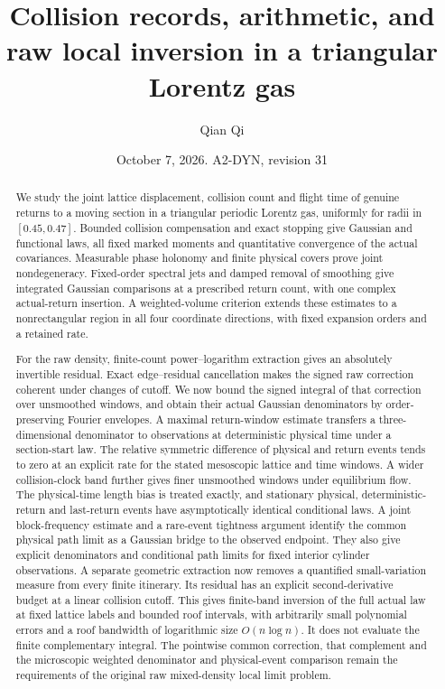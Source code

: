 \documentclass[11pt,reqno]{amsart}
\title[Collision records and raw local inversion]{Collision records, arithmetic, and raw local inversion in a triangular Lorentz gas}
\author{Qian Qi}
\date{October 7, 2026. A2-DYN, revision 31}
\numberwithin{equation}{section}
\theoremstyle{definition}\newtheorem{definition}[theorem]{Definition}
\theoremstyle{remark}\newtheorem{remark}[theorem]{Remark}
\begin{document}
\raggedbottom
\begin{abstract}
We study the joint lattice displacement, collision count and flight time
of genuine returns to a moving section in a triangular periodic Lorentz
gas, uniformly for radii in $[0.45,0.47]$. Bounded collision compensation
and exact stopping give Gaussian and functional laws, all fixed marked
moments and quantitative convergence of the actual covariances.
Measurable phase holonomy and finite physical covers prove joint
nondegeneracy. Fixed-order spectral jets and damped removal of smoothing
give integrated Gaussian comparisons at a prescribed return count,
with one complex actual-return insertion. A weighted-volume criterion
extends these estimates to a nonrectangular region in all four
coordinate directions, with fixed expansion orders and a retained rate.

For the raw density, finite-count power--logarithm extraction gives an
absolutely invertible residual. Exact edge--residual cancellation makes
the signed raw correction coherent under changes of cutoff. We now
bound the signed integral of that correction over unsmoothed windows,
and obtain their actual Gaussian denominators by order-preserving
Fourier envelopes. A maximal return-window estimate transfers a
three-dimensional denominator to observations at deterministic physical
time under a section-start law. The relative symmetric difference of
physical and return events tends to zero at an explicit rate for the
stated mesoscopic lattice and time windows. A wider collision-clock
band further gives finer unsmoothed windows under equilibrium flow.
The physical-time length bias is treated exactly, and stationary
physical, deterministic-return and last-return events have asymptotically
identical conditional laws. A joint block-frequency estimate and a
rare-event tightness argument identify the common physical path limit
as a Gaussian bridge to the observed endpoint. They also give explicit
denominators and conditional path limits for fixed interior cylinder
observations. A separate geometric extraction now removes a quantified
small-variation measure from every finite itinerary. Its residual has
an explicit second-derivative budget at a linear collision cutoff.
This gives finite-band inversion of the full actual law at fixed
lattice labels and bounded roof intervals, with arbitrarily small
polynomial errors and a roof bandwidth of logarithmic size
$O(n\log n)$. It does not evaluate the finite complementary integral.
The pointwise common correction, that complement and the microscopic
weighted denominator and physical-event comparison remain the
requirements of the original raw mixed-density local limit problem.
\end{abstract}
\maketitle
\end{document}
